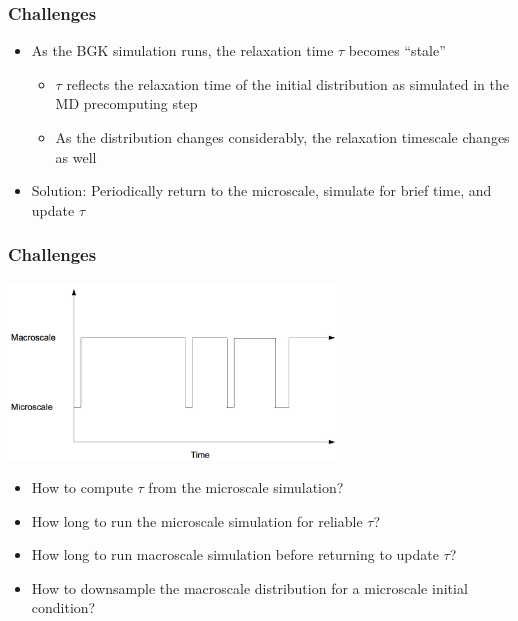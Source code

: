 \documentclass{beamer}
\begin{document}
\begin{frame}
\frametitle{Challenges}
\begin{itemize}
\item As the BGK simulation runs, the relaxation time $\tau$ becomes ``stale''\vspace{1em}
\begin{itemize}
\item $\tau$ reflects the relaxation time of the initial distribution as simulated in the MD precomputing step\vspace{1em}
\item As the distribution changes considerably, the relaxation timescale changes as well\vspace{1em}
\end{itemize}
\item Solution: Periodically return to the microscale, simulate for brief time, and update $\tau$
\end{itemize}
\end{frame}

\begin{frame}
\frametitle{Challenges}
\hspace*{3.5em}\includegraphics[width=0.65\textwidth]{scheme.png}
\begin{itemize}
\item How to compute $\tau$ from the microscale simulation?
\item How long to run the microscale simulation for reliable $\tau$?
\item How long to run macroscale simulation before returning to update $\tau$?
\item How to downsample the macroscale distribution for a microscale initial condition?
\end{itemize}
\end{frame}
\end{document}
